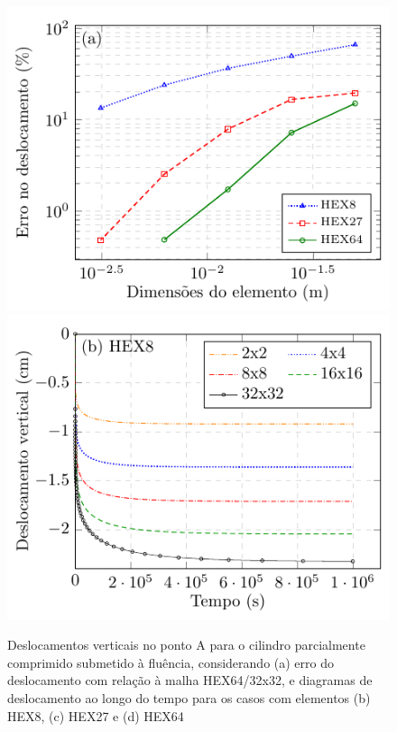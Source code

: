 \documentclass[Tese.tex]{subfiles}
\begin{document}
{\begin{figure}[!htb]
	\centering
	\caption{Deslocamentos verticais no ponto A para o cilindro parcialmente comprimido submetido à fluência, considerando (a) erro do deslocamento com relação à malha HEX64/32x32, e diagramas de deslocamento ao longo do tempo para os casos com elementos (b) HEX8, (c) HEX27 e (d) HEX64}
	\label{fig:vep-cylinder-v}
	\includegraphics[scale=1.0]{Figuras/PTFE-cylinder-mesh/VepCylinder-Creep-v-Conv.pdf}\;\;\includegraphics[scale=1.0]{Figuras/PTFE-cylinder-mesh/VepCylinder-Creep-v-1.pdf}	

\end{figure}}
\end{document}
